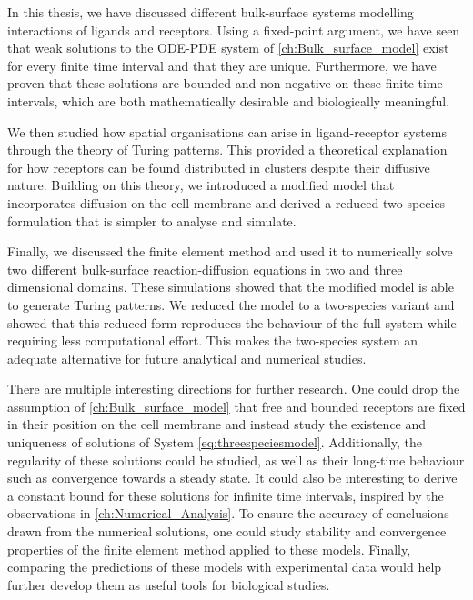 In this thesis, we have discussed different bulk-surface systems modelling interactions of ligands and receptors. Using a fixed-point argument, we have seen that weak solutions to the ODE-PDE system of \cref{ch:Bulk_surface_model} exist for every finite time interval and that they are unique. Furthermore, we have proven that these solutions are bounded and non-negative on these finite time intervals, which are both mathematically desirable and biologically meaningful.

We then studied how spatial organisations can arise in ligand-receptor systems through the theory of Turing patterns. This provided a theoretical explanation for how receptors can be found distributed in clusters despite their diffusive nature. Building on this theory, we introduced a modified model that incorporates diffusion on the cell membrane and derived a reduced two-species formulation that is simpler to analyse and simulate.

Finally, we discussed the finite element method and used it to numerically solve two different bulk-surface reaction-diffusion equations in two and three dimensional domains. These simulations showed that the modified model is able to generate Turing patterns. We reduced the model to a two-species variant and showed that this reduced form reproduces the behaviour of the full system while requiring less computational effort. This makes the two-species system an adequate alternative for future analytical and numerical studies.

There are multiple interesting directions for further research. One could drop the assumption of \cref{ch:Bulk_surface_model} that free and bounded receptors are fixed in their position on the cell membrane and instead study the existence and uniqueness of solutions of System \eqref{eq:threespeciesmodel}. Additionally, the regularity of these solutions could be studied, as well as their long-time behaviour such as convergence towards a steady state. It could also be interesting to derive a constant bound for these solutions for infinite time intervals, inspired by the observations in \cref{ch:Numerical_Analysis}. To ensure the accuracy of conclusions drawn from the numerical solutions, one could study stability and convergence properties of the finite element method applied to these models. Finally, comparing the predictions of these models with experimental data would help further develop them as useful tools for biological studies. 